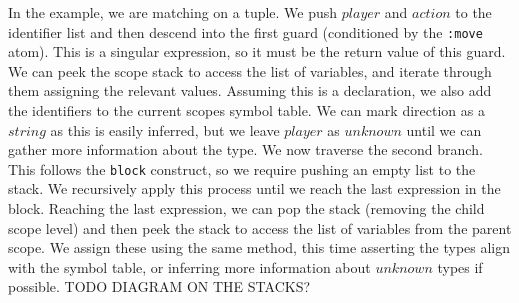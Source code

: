 In the example, we are matching on a tuple. We push $player$ and $action$ to the identifier list and then descend into the first guard (conditioned by the \texttt{:move} atom). This is a singular expression, so it must be the return value of this guard. We can peek the scope stack to access the list of variables, and iterate through them assigning the relevant values. Assuming this is a declaration, we also add the identifiers to the current scopes symbol table. We can mark direction as a $string$ as this is easily inferred, but we leave $player$ as $unknown$ until we can gather more information about the type. We now traverse the second branch. This follows the \texttt{block} construct, so we require pushing an empty list to the stack. We recursively apply this process until we reach the last expression in the block. Reaching the last expression, we can pop the stack (removing the child scope level) and then peek the stack to access the list of variables from the parent scope. We assign these using the same method, this time asserting the types align with the symbol table, or inferring more information about $unknown$ types if possible.
TODO DIAGRAM ON THE STACKS?
\par
